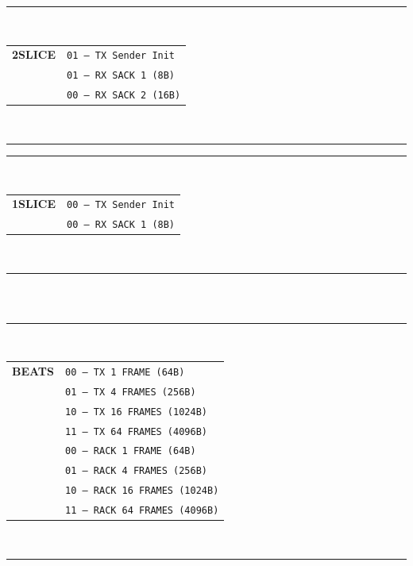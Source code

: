 \documentclass[../OAE-SPEC-MAIN.tex]{subfiles}
\begin{document}
\begin{margintable}
  \footnotesize
  \rule{5.4cm}{0.8pt}\\
  \begin{tabular}{@{}cl@{}}
    \textbf{2SLICE} & \texttt{01 — TX Sender Init} \\
                   & \texttt{01 — RX SACK 1 (8B)} \\
                   & \texttt{00 — RX SACK 2 (16B)} \\
  \end{tabular}\\
  \rule{5.4cm}{0.6pt}
\end{margintable}

\begin{margintable}
  \footnotesize
  \rule{5.4cm}{0.8pt}\\
  \begin{tabular}{@{}cl@{}}
    \textbf{1SLICE} & \texttt{00 — TX Sender Init} \\
                   & \texttt{00 — RX SACK 1 (8B)} \\
  \end{tabular}\\
  \rule{5.4cm}{0.6pt}
\end{margintable}

\begin{margintable} %
  \footnotesize
  \begin{tabular}{@{}cl@{}}
  \end{tabular}\\
\end{margintable}

\begin{margintable}
  \footnotesize
  \rule{5.4cm}{0.8pt}\\
  \begin{tabular}{@{}cl@{}}
    \textbf{BEATS} & \texttt{00 — TX 1 FRAME (64B)} \\
                   & \texttt{01 — TX 4 FRAMES (256B)} \\
                   & \texttt{10 — TX 16 FRAMES (1024B)} \\
                   & \texttt{11 — TX 64 FRAMES (4096B)} \\[3pt]
                   & \texttt{00 — RACK 1 FRAME (64B)} \\
                   & \texttt{01 — RACK 4 FRAMES (256B)} \\
                   & \texttt{10 — RACK 16 FRAMES (1024B)} \\
                   & \texttt{11 — RACK 64 FRAMES (4096B)} \\
  \end{tabular}\\
  \rule{5.4cm}{0.6pt}
\end{margintable}
\end{document}
